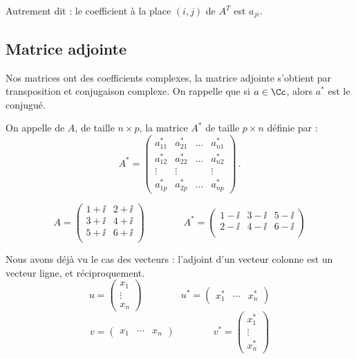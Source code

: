 \documentclass[11pt,class=report,crop=false]{standalone}
\begin{document}
Autrement dit : le coefficient à la place $(i,j)$ de $A^T$  est $a_{ji}$.


\subsection{Matrice adjointe}

Nos matrices ont des coefficients complexes, la matrice adjointe s'obtient par transposition et conjugaison complexe.
On rappelle que si $a\in\Cc$, alors $a^*$ est le conjugué.

\begin{definition}
On appelle  de $A$, de taille $n\times p$, la matrice $A^*$ de taille $p \times n$
définie par :
$$
A^* = \left(
\begin{array}{cccc}
a_{11}^* & a_{21}^* & \dots & a_{n1}^*\\
a_{12}^* & a_{22}^* & \dots & a_{n2}^*\\
\vdots & \vdots &&\vdots\\
a_{1p}^* & a_{2p}^* &\dots & a_{np}^*
\end{array}\right)\, .
$$
\end{definition}


\begin{exemple}
$$A = \begin{pmatrix}
1+\ii & 2+\ii\\
3+\ii & 4+\ii\\
5+\ii & 6+\ii\\
\end{pmatrix}
\qquad\qquad
A^* = \begin{pmatrix}
1-\ii & 3-\ii & 5-\ii\\
2-\ii & 4-\ii & 6-\ii\\
\end{pmatrix}
$$
\end{exemple}

Nous avons déjà vu le cas des vecteurs : l'adjoint d'un vecteur colonne est un vecteur ligne, et réciproquement.
$$u = \begin{pmatrix}x_1\\ \vdots \\ x_n\end{pmatrix}\qquad\qquad
u^* = \begin{pmatrix}x_1^* & \cdots & x_n^*\end{pmatrix}$$
$$v = \begin{pmatrix}x_1 & \cdots & x_n\end{pmatrix}\qquad\qquad
v^* = \begin{pmatrix}x_1^*\\ \vdots \\ x_n^*\end{pmatrix}$$
\end{document}
